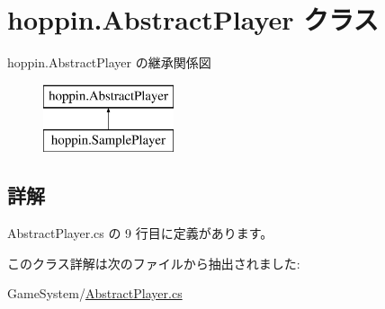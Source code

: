 \hypertarget{classhoppin_1_1_abstract_player}{}\section{hoppin.\+Abstract\+Player クラス}
\label{classhoppin_1_1_abstract_player}
hoppin.\+Abstract\+Player の継承関係図\begin{figure}[H]
\begin{center}
\leavevmode
\includegraphics[height=2.000000cm]{da/d2e/classhoppin_1_1_abstract_player}
\end{center}
\end{figure}


\subsection{詳解}


 Abstract\+Player.\+cs の 9 行目に定義があります。



このクラス詳解は次のファイルから抽出されました\+:\begin{DoxyCompactItemize}
\item 
Game\+System/\hyperlink{_abstract_player_8cs}{Abstract\+Player.\+cs}\end{DoxyCompactItemize}
